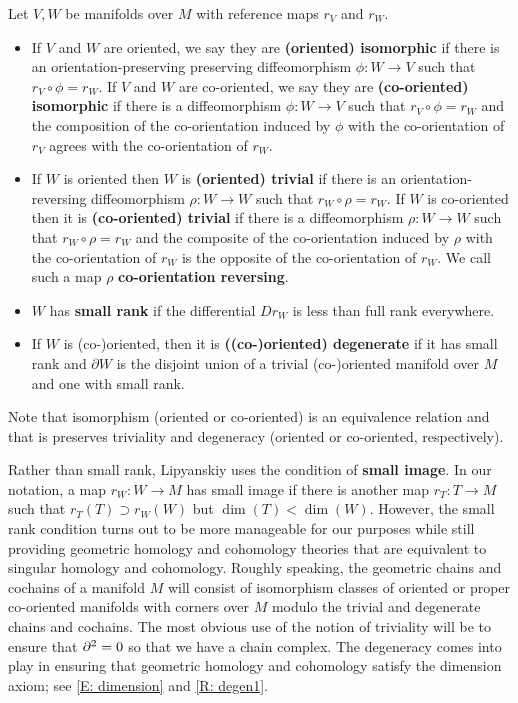 \begin{definition}\label{D: equiv, triv, and small}
 Let $V, W$ be  manifolds over $M$ with reference maps $r_V$ and $r_W$.
	\begin{itemize}
		\item If $V$ and $W$ are oriented, we say they are \textbf{(oriented) isomorphic} if there is an orientation-preserving  preserving diffeomorphism $\phi \colon W \to V$ such that $r_V \circ \phi = r_W$. If $V$ and $W$ are co-oriented, we say they are \textbf{(co-oriented) isomorphic} if there is a diffeomorphism $\phi \colon W \to V$ such that $r_V \circ \phi = r_W$ and the composition of the
co-orientation induced by  $\phi$
with the co-orientation of $r_V$ agrees with the co-orientation of $r_W$.


		\item If $W$ is oriented then $W$ is \textbf{(oriented) trivial} if there is an orientation-reversing
  diffeomorphism $\rho \colon W \to W$ such that $r_W \circ \rho = r_W$.  If $W$ is co-oriented then it is \textbf{(co-oriented) trivial} if there is a diffeomorphism $\rho:W\to W$ such that $r_W \circ \rho = r_W$ and
		the composite of the co-orientation induced by $\rho$ with the co-orientation of $r_W$ is the opposite of the co-orientation of $r_W$. We call such a map $\rho$ \textbf{co-orientation reversing}.

        \item $W$  has \textbf{small rank} if the differential $D r_W$ is less than full rank everywhere.
		\item If $W$ is (co-)oriented, then it is \textbf{((co-)oriented) degenerate} if it has small rank and ${\partial W}$ is the disjoint union of a trivial (co-)oriented
		manifold over $M$ and one with small rank.
	\end{itemize}
\end{definition}

Note that isomorphism (oriented or co-oriented) is an equivalence relation and that is preserves triviality and degeneracy (oriented or co-oriented, respectively).




Rather than small rank, Lipyanskiy uses the condition of \textbf{small image}. In our notation, a map $r_W:W\to M$ has small image if there is another map $r_T:T\to M$ such that $r_T(T)\supset r_W(W)$ but $\dim(T)<\dim(W)$. However, the small rank condition turns out to be more manageable for our purposes while still providing geometric homology and cohomology theories that are equivalent  to singular homology and cohomology. Roughly speaking, the geometric chains and cochains of a manifold $M$ will consist of isomorphism classes of oriented or proper co-oriented manifolds with corners over $M$ modulo the trivial and degenerate chains and cochains. The most obvious use of the notion of triviality will be to ensure that $\partial^2=0$ so that we have a chain complex. The degeneracy comes into play in ensuring that geometric homology and cohomology satisfy the dimension axiom; see \cref{E: dimension} and \cref{R: degen1}.








